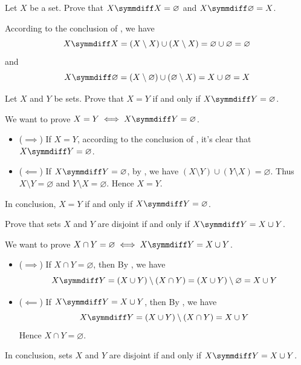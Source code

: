 \begin{chapex}
\label{cqSymmetricDifferenceOfSetWithItselfAndEmptySet}
Let $X$ be a set. Prove that $X \symmdiff X = \varnothing$ and $X \symmdiff \varnothing = X$.
\end{chapex}

\begin{myproof}
    According to the conclusion of , we have
    $$
    X \symmdiff X = (X \setminus X) \cup (X \setminus X) = \varnothing \cup \varnothing = \varnothing
    $$
    and
    $$
    X \symmdiff \varnothing = (X \setminus \varnothing) \cup (\varnothing \setminus X) = X \cup \varnothing = X
    $$
\end{myproof}

\begin{chapex}
Let $X$ and $Y$ be sets. Prove that $X = Y$ if and only if $X \symmdiff Y = \varnothing$.
\end{chapex}

\begin{myproof}
    We want to prove $X = Y \iff X \symmdiff Y = \varnothing$.
    \begin{itemize}
    \item ($\implies$) If $X = Y$, according to the conclusion of , it's clear that $X \symmdiff Y = \varnothing$.
    \item ($\impliedby$) If $X \symmdiff Y = \varnothing$, by , we have $(X \setminus Y) \cup (Y \setminus X) = \varnothing$. Thus $X \setminus Y = \varnothing$ and $Y \setminus X = \varnothing$. Hence $X = Y$.
    \end{itemize}
    In conclusion, $X = Y$ if and only if $X \symmdiff Y = \varnothing$.
\end{myproof}

\begin{chapex}
Prove that sets $X$ and $Y$ are disjoint if and only if $X \symmdiff Y = X \cup Y$.
\end{chapex}

\begin{myproof}
    We want to prove $X \cap Y = \varnothing \iff X \symmdiff Y = X \cup Y$.
    \begin{itemize}
    \item ($\implies$) If $X \cap Y = \varnothing$, then By , we have
    \[X \symmdiff Y = (X \cup Y) \setminus (X \cap Y) = (X \cup Y) \setminus \varnothing = X \cup Y\]
    \item ($\impliedby$) If $X \symmdiff Y = X \cup Y$, then By , we have
    \[X \symmdiff Y = (X \cup Y) \setminus (X \cap Y) = X \cup Y\]
    Hence $X \cap Y = \varnothing$.
    \end{itemize}
    In conclusion, sets $X$ and $Y$ are disjoint if and only if $X \symmdiff Y = X \cup Y$.
\end{myproof}

